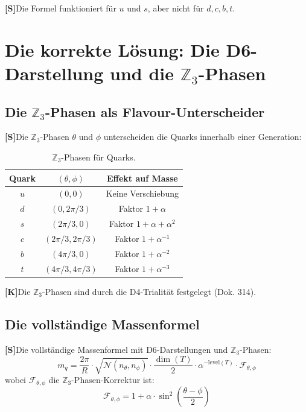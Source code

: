 \documentclass[11pt,a4paper]{article}
\newcommand{\Kstatus}{\textbf{[K]}}
\newcommand{\Sstatus}{\textbf{[S]}}
\begin{document}
	\Sstatus Die Formel funktioniert für $u$ und $s$, aber nicht für $d, c, b, t$.
	
	\section{Die korrekte Lösung: Die D6-Darstellung und die $\mathbb{Z}_3$-Phasen}
	
	\subsection{Die $\mathbb{Z}_3$-Phasen als Flavour-Unterscheider}
	
	\Sstatus Die $\mathbb{Z}_3$-Phasen $\theta$ und $\phi$ unterscheiden die Quarks innerhalb einer Generation:
	
	\begin{table}[h!]
		\centering
		\caption{$\mathbb{Z}_3$-Phasen für Quarks.}
		\label{tab:z3_phases}
		\begin{tabular}{c c c}
			\toprule
			\textbf{Quark} & $(\theta, \phi)$ & \textbf{Effekt auf Masse} \\
			\midrule
			$u$ & $(0, 0)$ & Keine Verschiebung \\
			$d$ & $(0, 2\pi/3)$ & Faktor $1 + \alpha$ \\
			$s$ & $(2\pi/3, 0)$ & Faktor $1 + \alpha + \alpha^2$ \\
			$c$ & $(2\pi/3, 2\pi/3)$ & Faktor $1 + \alpha^{-1}$ \\
			$b$ & $(4\pi/3, 0)$ & Faktor $1 + \alpha^{-2}$ \\
			$t$ & $(4\pi/3, 4\pi/3)$ & Faktor $1 + \alpha^{-3}$ \\
			\bottomrule
		\end{tabular}
	\end{table}
	
	\Kstatus Die $\mathbb{Z}_3$-Phasen sind durch die D4-Trialität festgelegt (Dok. 314).
	
	\subsection{Die vollständige Massenformel}
	
	\Sstatus Die vollständige Massenformel mit D6-Darstellungen und $\mathbb{Z}_3$-Phasen:
	\begin{equation}
		m_q = \frac{2\pi}{R} \cdot \sqrt{\mathcal{N}(n_\theta, n_\phi)} \cdot \frac{\dim(T)}{2} \cdot \alpha^{-\text{level}(T)} \cdot \mathcal{F}_{\theta,\phi}
	\end{equation}
	wobei $\mathcal{F}_{\theta,\phi}$ die $\mathbb{Z}_3$-Phasen-Korrektur ist:
	\begin{equation}
		\mathcal{F}_{\theta,\phi} = 1 + \alpha \cdot \sin^2\left(\frac{\theta - \phi}{2}\right)
	\end{equation}
	
\end{document}
